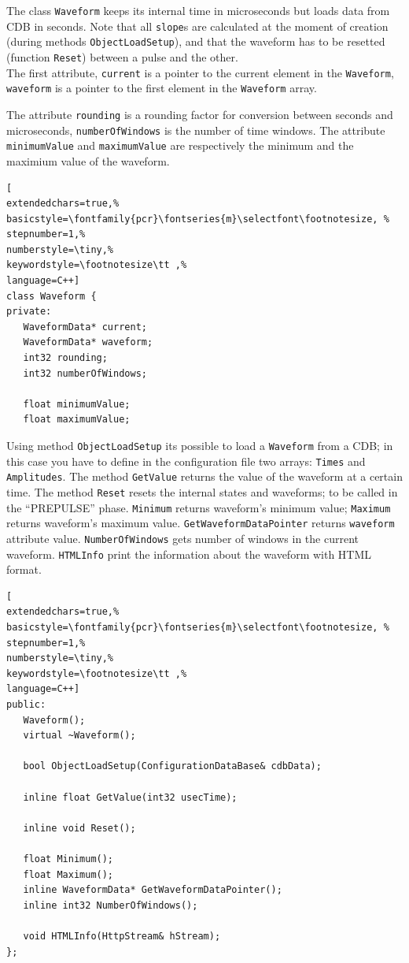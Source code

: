 The class \texttt{Waveform} keeps its internal time in microseconds but loads data from CDB in seconds. Note that all \texttt{slope}s are calculated at the moment of creation (during methods \texttt{ObjectLoadSetup}), and that the waveform has to be resetted (function \texttt{Reset}) between a pulse and the other. \\


The first attribute, \texttt{current} is a pointer to the current element in the \texttt{Waveform}, \texttt{waveform} is a pointer to the first element in the \texttt{Waveform} array.

The attribute \texttt{rounding} is a rounding factor for conversion between seconds and microseconds, \texttt{numberOfWindows} is the number of time windows. The attribute \texttt{minimumValue} and \texttt{maximumValue} are respectively the minimum and the maximium value of the waveform.

\begin{lstlisting}[
extendedchars=true,%
basicstyle=\fontfamily{pcr}\fontseries{m}\selectfont\footnotesize, %
stepnumber=1,%
numberstyle=\tiny,%
keywordstyle=\footnotesize\tt ,%
language=C++]
class Waveform {
private:
   WaveformData* current;
   WaveformData* waveform;
   int32 rounding;
   int32 numberOfWindows;

   float minimumValue;
   float maximumValue;
\end{lstlisting}

Using method \texttt{ObjectLoadSetup} its possible to load a \texttt{Waveform} from a CDB; in this case you have to define in the configuration file two arrays: \texttt{Times} and \texttt{Amplitudes}.
The method \texttt{GetValue} returns the value of the waveform at a certain time. The method \texttt{Reset} resets the internal states and waveforms; to be called in the ``PREPULSE'' phase. \texttt{Minimum} returns waveform's minimum value; \texttt{Maximum} returns waveform's maximum value. \texttt{GetWaveformDataPointer} returns \texttt{waveform} attribute value. \texttt{NumberOfWindows} gets number of windows in the current waveform. \texttt{HTMLInfo} print the information about the waveform with HTML format.

\begin{lstlisting}[
extendedchars=true,%
basicstyle=\fontfamily{pcr}\fontseries{m}\selectfont\footnotesize, %
stepnumber=1,%
numberstyle=\tiny,%
keywordstyle=\footnotesize\tt ,%
language=C++]
public:
   Waveform();
   virtual ~Waveform();

   bool ObjectLoadSetup(ConfigurationDataBase& cdbData);

   inline float GetValue(int32 usecTime);

   inline void Reset();

   float Minimum();
   float Maximum();
   inline WaveformData* GetWaveformDataPointer();
   inline int32 NumberOfWindows();

   void HTMLInfo(HttpStream& hStream);
};
\end{lstlisting}



